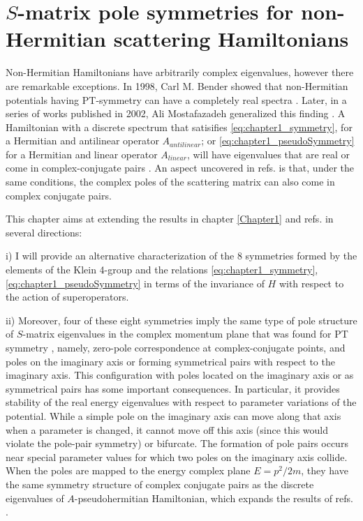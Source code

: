 
\chapter{$S$-matrix pole symmetries for non-Hermitian scattering Hamiltonians}
\label{Chapter2}

Non-Hermitian Hamiltonians have arbitrarily complex eigenvalues, however there are remarkable exceptions. In 1998, Carl M. Bender showed that non-Hermitian potentials having PT-symmetry can have a completely real spectra \cite{Bender1998}. Later, in a series of works published in 2002, Ali Mostafazadeh generalized this finding \cite{Mostafazadeh2002,Mostafazadeh2002a,Mostafazadeh2002b}. A Hamiltonian with a discrete spectrum that satisifies \eqref{eq:chapter1_symmetry}, for a Hermitian and antilinear operator $A_{antilinear}$; or \eqref{eq:chapter1_pseudoSymmetry} for a Hermitian and linear operator $A_{linear}$, will have eigenvalues that are real or come in complex-conjugate pairs \cite{Mostafazadeh2002,Mostafazadeh2002a,Mostafazadeh2002b}. An aspect uncovered in refs. \cite{Mostafazadeh2002,Mostafazadeh2002a,Mostafazadeh2002b} is that, under the same conditions, the complex poles of the scattering matrix can also come in complex conjugate pairs.

This chapter aims at extending the results in chapter \ref{Chapter1} and refs. \cite{Mostafazadeh2002,Mostafazadeh2002a,Mostafazadeh2002b} in several directions:

i) I will provide an alternative characterization of the 8 symmetries formed by the elements of the Klein 4-group and the relations \eqref{eq:chapter1_symmetry}, \eqref{eq:chapter1_pseudoSymmetry} in terms of the invariance of $H$ with respect to the action of superoperators.

ii) Moreover,
four of these eight symmetries imply the same
type of pole structure of $S$-matrix eigenvalues in the complex momentum plane that was found for PT symmetry \cite{Muga2004},
namely, zero-pole correspondence at complex-conjugate points, and poles on the imaginary axis or forming symmetrical pairs with respect to the imaginary
axis. This configuration with poles located on the imaginary  axis or as symmetrical pairs has some important consequences. In particular, it provides stability of the real energy eigenvalues with respect to parameter variations of the potential. While a simple pole on the imaginary axis can move along that axis when a parameter is changed, it cannot move off this axis (since this would violate the pole-pair symmetry) or bifurcate. The formation of pole pairs occurs near special  parameter values for which two poles on the imaginary axis collide. When the poles are mapped to the energy complex plane $E = p^2/2m$, they have the same symmetry structure of complex conjugate pairs as the discrete eigenvalues of $A$-pseudohermitian Hamiltonian, which expands the results of refs. \cite{Mostafazadeh2002,Mostafazadeh2002a,Mostafazadeh2002b}.


